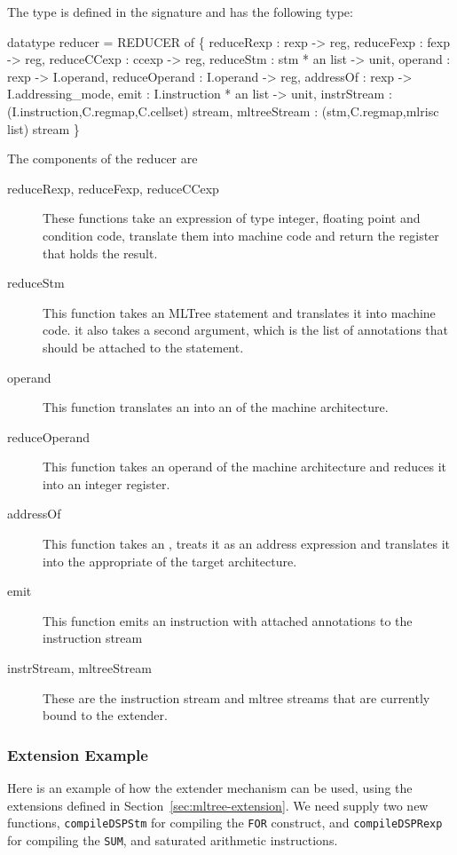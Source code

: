 The  type is defined
in the signature  and has the
following type:
\begin{SML}
  datatype reducer =
    REDUCER of
    \{ reduceRexp    : rexp -> reg,
      reduceFexp    : fexp -> reg,
      reduceCCexp   : ccexp -> reg,
      reduceStm     : stm * an list -> unit,
      operand       : rexp -> I.operand,
      reduceOperand : I.operand -> reg,
      addressOf     : rexp -> I.addressing_mode,
      emit          : I.instruction * an list -> unit,
      instrStream   : (I.instruction,C.regmap,C.cellset) stream,
      mltreeStream  : (stm,C.regmap,mlrisc list) stream
    \}
\end{SML}

The components of the reducer are
\begin{description}
  \item[reduceRexp, reduceFexp, reduceCCexp] These functions 
take an expression of type integer, floating point and condition code, 
translate them into machine code and return the 
register that holds the result. 
  \item[reduceStm] This function takes an MLTree statement and translates
it into machine code.  it also takes a second argument, which is the
list of annotations that should be attached to the statement.
  \item[operand] This function translates an  into an
  of the machine architecture.
  \item[reduceOperand] This function takes an operand of the machine
architecture and reduces it into an integer register.
  \item[addressOf] This function takes an , treats
it as an address expression and translates it into the appropriate
 of the target architecture.
  \item[emit]  This function emits an instruction with attached annotations
to the instruction stream
  \item[instrStream, mltreeStream]  These are the instruction stream
and mltree streams that are currently bound to the extender.
\end{description}

\subsubsection{Extension Example}
Here is an example of how the extender mechanism can be used,
using the  extensions defined in
Section~\ref{sec:mltree-extension}.   We need supply two
new functions, \verb|compileDSPStm| for compiling the \verb|FOR|
construct, and \verb|compileDSPRexp| for compiling the \verb|SUM|,
and saturated arithmetic instructions.

